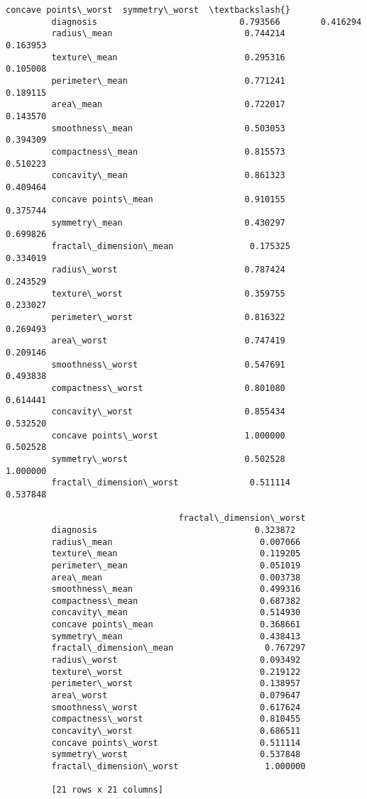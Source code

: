 \documentclass[11pt]{article}
\begin{document}
\begin{Verbatim}[commandchars=\\\{\}]
                                  concave points\_worst  symmetry\_worst  \textbackslash{}
         diagnosis                            0.793566        0.416294   
         radius\_mean                          0.744214        0.163953   
         texture\_mean                         0.295316        0.105008   
         perimeter\_mean                       0.771241        0.189115   
         area\_mean                            0.722017        0.143570   
         smoothness\_mean                      0.503053        0.394309   
         compactness\_mean                     0.815573        0.510223   
         concavity\_mean                       0.861323        0.409464   
         concave points\_mean                  0.910155        0.375744   
         symmetry\_mean                        0.430297        0.699826   
         fractal\_dimension\_mean               0.175325        0.334019   
         radius\_worst                         0.787424        0.243529   
         texture\_worst                        0.359755        0.233027   
         perimeter\_worst                      0.816322        0.269493   
         area\_worst                           0.747419        0.209146   
         smoothness\_worst                     0.547691        0.493838   
         compactness\_worst                    0.801080        0.614441   
         concavity\_worst                      0.855434        0.532520   
         concave points\_worst                 1.000000        0.502528   
         symmetry\_worst                       0.502528        1.000000   
         fractal\_dimension\_worst              0.511114        0.537848   
         
                                  fractal\_dimension\_worst  
         diagnosis                               0.323872  
         radius\_mean                             0.007066  
         texture\_mean                            0.119205  
         perimeter\_mean                          0.051019  
         area\_mean                               0.003738  
         smoothness\_mean                         0.499316  
         compactness\_mean                        0.687382  
         concavity\_mean                          0.514930  
         concave points\_mean                     0.368661  
         symmetry\_mean                           0.438413  
         fractal\_dimension\_mean                  0.767297  
         radius\_worst                            0.093492  
         texture\_worst                           0.219122  
         perimeter\_worst                         0.138957  
         area\_worst                              0.079647  
         smoothness\_worst                        0.617624  
         compactness\_worst                       0.810455  
         concavity\_worst                         0.686511  
         concave points\_worst                    0.511114  
         symmetry\_worst                          0.537848  
         fractal\_dimension\_worst                 1.000000  
         
         [21 rows x 21 columns]
\end{Verbatim}
            
\end{document}
